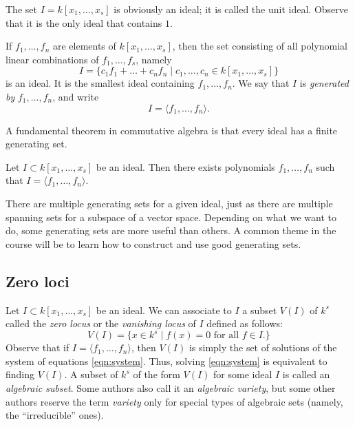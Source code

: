 \documentclass[11pt]{article}
\begin{document}
\begin{example}
  The set $I = k[x_1,\dots,x_s]$ is obviously an ideal; it is called the unit ideal.
  Observe that it is the only ideal that contains $1$.
\end{example}

\begin{example}
  If $f_1, \dots, f_n$ are elements of $k[x_1, \dots, x_s]$, then the set consisting of all polynomial linear combinations of $f_1, \dots, f_s$, namely
  \[ I = \{c_1f_1 + \dots + c_nf_n \mid c_1, \dots, c_n \in k[x_1,\dots,x_s]\}\]
  is an ideal.
  It is the smallest ideal containing $f_1, \dots, f_n$.
  We say that $I$ is \emph{generated by} $f_1, \dots, f_n$, and write
  \[ I = \langle  f_1, \dots, f_n \rangle.\]
\end{example}

A fundamental theorem in commutative algebra is that every ideal has a finite generating set.
\begin{theorem}
  Let $I \subset k[x_1, \dots, x_s]$ be an ideal.
  Then there exists polynomials $f_1, \dots, f_n$ such that $I = \langle  f_1, \dots, f_n \rangle$.
\end{theorem}
There are multiple generating sets for a given ideal, just as there are multiple spanning sets for a subspace of a vector space.
Depending on what we want to do, some generating sets are more useful than others.
A common theme in the course will be to learn how to construct and use good generating sets.

\subsection{Zero loci}
Let $I \subset k[x_1, \dots, x_s]$ be an ideal.
We can associate to $I$ a subset $V(I)$ of $k^s$ called the \emph{zero locus} or the \emph{vanishing locus} of $I$ defined as follows:
\[
  V(I) = \{x \in k^s \mid f(x) = 0 \text{ for all $f \in I$}.\}
\]
Observe that if $I = \langle  f_1, \dots, f_n \rangle$, then $V(I)$ is simply the set of solutions of the system of equations \eqref{eqn:system}.
Thus, solving \eqref{eqn:system} is equivalent to finding $V(I)$.
A subset of $k^s$ of the form $V(I)$ for some ideal $I$ is called an \emph{algebraic subset}.
Some authors also call it an \emph{algebraic variety}, but some other authors reserve the term \emph{variety} only for special types of algebraic sets (namely, the ``irreducible'' ones).
\end{document}
